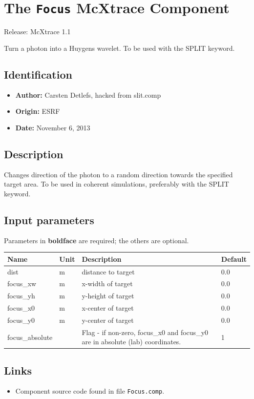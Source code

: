 \section{The \texttt{Focus} McXtrace Component}
Release: McXtrace 1.1

Turn a photon into a Huygens wavelet. To be used with the SPLIT keyword.

\subsection*{Identification}
\begin{itemize}
  \item \textbf{Author:} Carsten Detlefs, hacked from slit.comp
  \item \textbf{Origin:} ESRF
  \item \textbf{Date:} November 6, 2013
\end{itemize}

\subsection*{Description}
Changes direction of the photon to a random direction towards the specified target area. To be used in coherent simulations, preferably with the SPLIT keyword.

\subsection*{Input parameters}
Parameters in \textbf{boldface} are required; the others are optional.

\begin{longtable}{p{}p{}p{}p{}}
\toprule
\textbf{Name} & \textbf{Unit} & \textbf{Description} & \textbf{Default} \\
\midrule
\endhead
dist & m & distance to target & 0.0 \\
focus\_xw & m & x-width of target & 0.0 \\
focus\_yh & m & y-height of target & 0.0 \\
focus\_x0 & m & x-center of target & 0.0 \\
focus\_y0 & m & y-center of target & 0.0 \\
focus\_absolute &   & Flag - if non-zero, focus\_x0 and focus\_y0 are in absolute (lab) coordinates. & 1 \\
\bottomrule
\end{longtable}

\subsection*{Links}
\begin{itemize}
  \item Component source code found in file \texttt{Focus.comp}.
\end{itemize}

